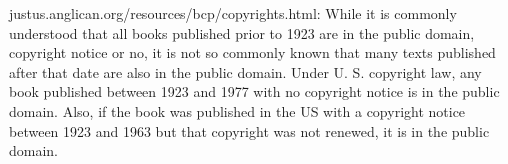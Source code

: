 \documentclass[foolscapvopaper,10pt,twoside,openany,extrafontsizes,final]{memoir}
\begin{document}

justus.anglican.org/resources/bcp/copyrights.html:
While it is commonly understood that all books published prior to 1923 are in the public domain, copyright notice or no, it is not so commonly known that many texts published after that date are also in the public domain. Under U. S. copyright law, any book published between 1923 and 1977 with no copyright notice is in the public domain. Also, if the book was published in the US with a copyright notice between 1923 and 1963 but that copyright was not renewed, it is in the public domain.

% 
\end{document}
